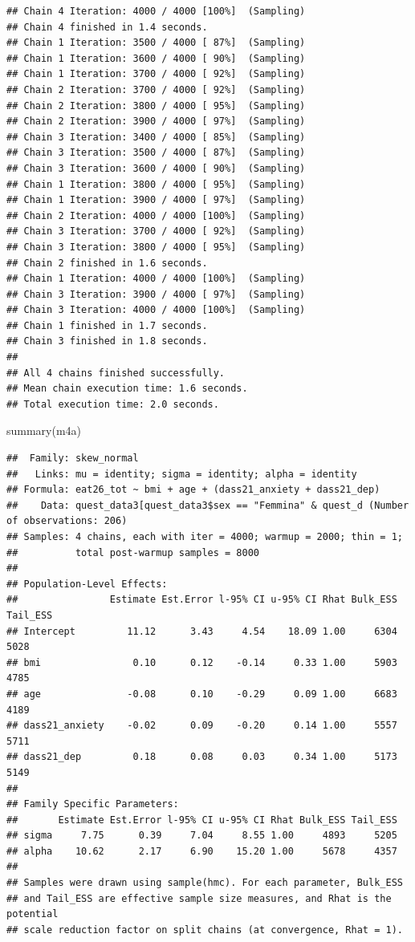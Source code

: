 \documentclass[
]{article}
\newenvironment{Shaded}{\begin{snugshade}}{\end{snugshade}}
\newcommand{\FunctionTok}[1]{\textcolor[rgb]{0.00,0.00,0.00}{#1}}
\newcommand{\NormalTok}[1]{#1}
\begin{document}
\begin{verbatim}
## Chain 4 Iteration: 4000 / 4000 [100%]  (Sampling) 
## Chain 4 finished in 1.4 seconds.
## Chain 1 Iteration: 3500 / 4000 [ 87%]  (Sampling) 
## Chain 1 Iteration: 3600 / 4000 [ 90%]  (Sampling) 
## Chain 1 Iteration: 3700 / 4000 [ 92%]  (Sampling) 
## Chain 2 Iteration: 3700 / 4000 [ 92%]  (Sampling) 
## Chain 2 Iteration: 3800 / 4000 [ 95%]  (Sampling) 
## Chain 2 Iteration: 3900 / 4000 [ 97%]  (Sampling) 
## Chain 3 Iteration: 3400 / 4000 [ 85%]  (Sampling) 
## Chain 3 Iteration: 3500 / 4000 [ 87%]  (Sampling) 
## Chain 3 Iteration: 3600 / 4000 [ 90%]  (Sampling) 
## Chain 1 Iteration: 3800 / 4000 [ 95%]  (Sampling) 
## Chain 1 Iteration: 3900 / 4000 [ 97%]  (Sampling) 
## Chain 2 Iteration: 4000 / 4000 [100%]  (Sampling) 
## Chain 3 Iteration: 3700 / 4000 [ 92%]  (Sampling) 
## Chain 3 Iteration: 3800 / 4000 [ 95%]  (Sampling) 
## Chain 2 finished in 1.6 seconds.
## Chain 1 Iteration: 4000 / 4000 [100%]  (Sampling) 
## Chain 3 Iteration: 3900 / 4000 [ 97%]  (Sampling) 
## Chain 3 Iteration: 4000 / 4000 [100%]  (Sampling) 
## Chain 1 finished in 1.7 seconds.
## Chain 3 finished in 1.8 seconds.
## 
## All 4 chains finished successfully.
## Mean chain execution time: 1.6 seconds.
## Total execution time: 2.0 seconds.
\end{verbatim}

\begin{Shaded}
\begin{Highlighting}[]
\FunctionTok{summary}\NormalTok{(m4a)}
\end{Highlighting}
\end{Shaded}

\begin{verbatim}
##  Family: skew_normal 
##   Links: mu = identity; sigma = identity; alpha = identity 
## Formula: eat26_tot ~ bmi + age + (dass21_anxiety + dass21_dep) 
##    Data: quest_data3[quest_data3$sex == "Femmina" & quest_d (Number of observations: 206) 
## Samples: 4 chains, each with iter = 4000; warmup = 2000; thin = 1;
##          total post-warmup samples = 8000
## 
## Population-Level Effects: 
##                Estimate Est.Error l-95% CI u-95% CI Rhat Bulk_ESS Tail_ESS
## Intercept         11.12      3.43     4.54    18.09 1.00     6304     5028
## bmi                0.10      0.12    -0.14     0.33 1.00     5903     4785
## age               -0.08      0.10    -0.29     0.09 1.00     6683     4189
## dass21_anxiety    -0.02      0.09    -0.20     0.14 1.00     5557     5711
## dass21_dep         0.18      0.08     0.03     0.34 1.00     5173     5149
## 
## Family Specific Parameters: 
##       Estimate Est.Error l-95% CI u-95% CI Rhat Bulk_ESS Tail_ESS
## sigma     7.75      0.39     7.04     8.55 1.00     4893     5205
## alpha    10.62      2.17     6.90    15.20 1.00     5678     4357
## 
## Samples were drawn using sample(hmc). For each parameter, Bulk_ESS
## and Tail_ESS are effective sample size measures, and Rhat is the potential
## scale reduction factor on split chains (at convergence, Rhat = 1).
\end{verbatim}
\end{document}
